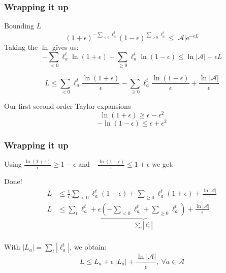 \documentclass{beamer}
\begin{document}
\begin{frame}
    \frametitle{Wrapping it up}

    \begin{block}{Bounding $L$}
        \begin{equation*}
                    (1 + \epsilon)^{- \sum_{< 0} \ell_a^t}
                    (1 - \epsilon)^{\sum_{\geq 0} \ell_a^t}
                    \leq |\mathcal{A}| \mathrm{e}^{- \epsilon L}
            \end{equation*}
            Taking the $\ln$ gives us:
        \begin{equation*}
        - \sum_{<0} \ell_a^t \ln(1 + \epsilon)
        + \sum_{\geq 0} \ell_a^t \ln(1 - \epsilon)
        \leq \ln |\mathcal{A}| -\epsilon L
        \end{equation*}

        \begin{equation*}
        L \leq
        \sum_{< 0} \ell_a^t \frac{\ln(1 + \epsilon)}{\epsilon}
        - \sum_{\geq 0} \ell_a^t \frac{\ln(1 - \epsilon)}{\epsilon}
        +\frac{\ln |\mathcal{A}|}{\epsilon}
        \end{equation*}
    \end{block}

    \begin{block}{Our first second-order Taylor expansions}
        \begin{equation*}
            \ln(1 + \epsilon) \geq \epsilon - \epsilon^2
        \end{equation*}
        \begin{equation*}
        -\ln(1 - \epsilon) \leq \epsilon + \epsilon^2
        \end{equation*}
    \end{block}

\end{frame}

\begin{frame}
    \frametitle{Wrapping it up}

    Using
    $\frac{\ln(1 + \epsilon)}{\epsilon} \geq 1 - \epsilon$ and
    $-\frac{\ln(1 - \epsilon)}{\epsilon} \leq 1 + \epsilon$
    we get:

    \begin{block}{Done!}
    \begin{align*}
    L & \leq
        \frac{1}{\epsilon} \sum_{< 0} \ell_a^t (1 - \epsilon)
        + \sum_{\geq 0} \ell_a^t (1 + \epsilon)
    + \frac{\ln |\mathcal{A}|}{\epsilon} \\
    L & \leq
    \sum_t \ell_a^t
    + \epsilon
    \underbrace{
    (- \sum_{< 0} \ell_a^t + \sum_{\geq 0} \ell_a^t)}_{\sum_{t} |\ell_a^t|}
    + \frac{\ln |\mathcal{A}|}{\epsilon} \\
    \end{align*}

    With $|L_a| = \sum_{t} |\ell_a^t|$, we obtain:
    \begin{equation*}
    L \leq L_a + \epsilon~|L_a|
    +\frac{\ln |\mathcal{A}|}{\epsilon},~ \forall a\in \mathcal{A}
    \end{equation*}
    \end{block}

\end{frame}
\end{document}
